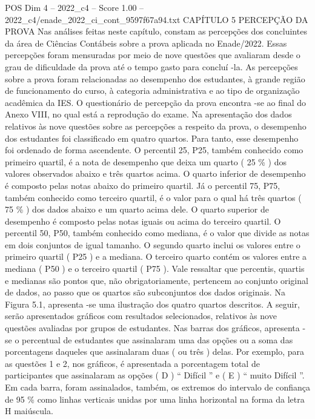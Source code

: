 \begin{textsample}{POS Dim 4 – 2022\_c4 – Score 1.00 – 2022\_c4/enade\_2022\_ci\_cont\_9597f67a94.txt}  \label{ex:f4_pos_144}
CAPÍTULO 5 PERCEPÇÃO DA PROVA Nas análises feitas neste capítulo, constam as percepções dos concluintes da área de Ciências Contábeis sobre a prova aplicada no Enade/2022.
Essas percepções foram mensuradas por meio de nove questões que avaliaram desde o grau de dificuldade da prova até o tempo gasto para concluí -la.
As percepções sobre a prova foram relacionadas ao desempenho dos estudantes, à grande região de funcionamento do curso, à categoria administrativa e ao tipo de organização acadêmica da IES.
O questionário de percepção da prova encontra -se ao final do Anexo VIII, no qual está a reprodução do exame.
Na apresentação dos dados relativos às nove questões sobre as percepções a respeito da prova, o desempenho dos estudantes foi classificado em quatro quartos.
Para tanto, esse desempenho foi ordenado de forma ascendente.
O percentil 25, P25, também conhecido como primeiro quartil, é a nota de desempenho que deixa um quarto ( 25 \% ) dos valores observados abaixo e três quartos acima.
O quarto inferior de desempenho é composto pelas notas abaixo do primeiro quartil.
Já o percentil 75, P75, também conhecido como terceiro quartil, é o valor para o qual há três quartos ( 75 \% ) dos dados abaixo e um quarto acima dele.
O quarto superior de desempenho é composto pelas notas iguais ou acima do terceiro quartil.
O percentil 50, P50, também conhecido como mediana, é o valor que divide as notas em dois conjuntos de igual tamanho.
O segundo quarto inclui os valores entre o primeiro quartil ( P25 ) e a mediana.
O terceiro quarto contém os valores entre a mediana ( P50 ) e o terceiro quartil ( P75 ).
Vale ressaltar que percentis, quartis e medianas são pontos que, não obrigatoriamente, pertencem ao conjunto original de dados, ao passo que os quartos são subconjuntos dos dados originais.
Na Figura 5.1, apresenta -se uma ilustração dos quatro quartos descritos.
A seguir, serão apresentados gráficos com resultados selecionados, relativos às nove questões avaliadas por grupos de estudantes.
Nas barras dos gráficos, apresenta -se o percentual de estudantes que assinalaram uma das opções ou a soma das porcentagens daqueles que assinalaram duas ( ou três ) delas.
Por exemplo, para as questões 1 e 2, nos gráficos, é apresentada a porcentagem total de participantes que assinalaram as opções ( D ) “ Difícil ” e ( E ) “ muito Difícil ”.
Em cada barra, foram assinalados, também, os extremos do intervalo de confiança de 95 \% como linhas verticais unidas por uma linha horizontal na forma da letra H maiúscula.

\end{textsample}
